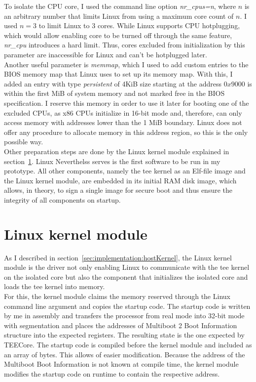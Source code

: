 To isolate the CPU core, I used the command line option \textit{nr\_cpus=n},
where $n$ is an arbitrary number that limits Linux from using a maximum core
count of $n$. I used $n=3$ to limit Linux to 3 cores. While Linux supports CPU
hotplugging, which would allow enabling core to be turned off through
the same feature, \textit{nr\_cpu} introduces a hard limit. Thus, cores excluded
from initialization by this parameter are inaccessible for Linux and can't be
hotplugged later. \\

Another useful parameter is \textit{memmap}, which I used to add custom entries
to the BIOS memory map that Linux uses to set up its memory map. With this, I
added an entry with type \textit{persistent} of 4KiB size starting at the
address $0x9000$ is within the first MiB of system memory and not marked free in
the BIOS specification. I reserve this memory in order to use it
later for booting one of the excluded CPUs, as x86 CPUs initialize in 16-bit
mode and, therefore, can only access memory with addresses lower than the 1 MiB
boundary. Linux does not offer any procedure to allocate memory in this address
region, so this is the only possible way. \\

Other preparation steps are done by the Linux kernel module explained in
section~\ref{sec:implementation:kmod}. Linux Neverthelss serves is the first
software to be run in my prototype. All other components, namely the \gls{tee}
kernel as an Elf-file image and the Linux kernel module, are embedded in its
initial RAM disk image, which allows, in theory, to sign a single image for
secure boot and thus ensure the integrity of all components on startup.\\

\section{Linux kernel module}
\label{sec:implementation:kmod}
As I described in section~\ref{sec:implementation:hostKernel}, the Linux kernel
module is the driver not only enabling Linux to communicate with the \gls{tee}
kernel on the isolated core but also the component that initializes the isolated
core and loads the \gls{tee} kernel into memory.\\

For this, the kernel module claims the memory reserved through the Linux command
line argument and copies the startup code. The startup code is written by me in
assembly and transfers the processor from real mode into 32-bit mode with
segmentation and places the addresses of Multiboot 2 Boot Information structure
into the expected registers. The resulting state is the one expected by TEECore.
The startup code is compiled before the kernel module and included as an array
of bytes. This allows of easier modification. Because the address of the
Multiboot Boot Information is not known at compile time, the kernel module
modifies the startup code on runtime to contain the respective address.\\

